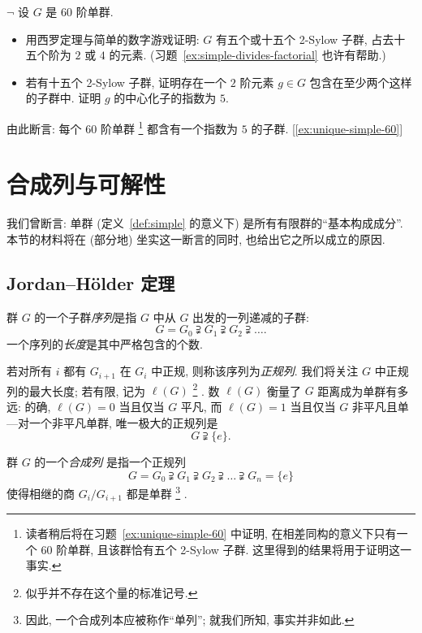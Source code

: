 \begin{prob}
\label{ex:simple-60}
$\neg$ 设 $G$ 是 $60$ 阶单群.
\begin{itemize}
	\item 用西罗定理与简单的数字游戏证明: $G$ 有五个或十五个 2-Sylow 子群, 占去十五个阶为 $2$ 或 $4$ 的元素. (习题~\ref{ex:simple-divides-factorial} 也许有帮助.)
	\item 若有十五个 2-Sylow 子群, 证明存在一个 $2$ 阶元素 $g\in G$ 包含在至少两个这样的子群中. 证明 $g$ 的中心化子的指数为 $5$.
\end{itemize}
由此断言: 每个 $60$ 阶单群%
\footnote{读者稍后将在习题~\ref{ex:unique-simple-60} 中证明, 在相差同构的意义下只有一个 $60$ 阶单群, 且该群恰有五个 2-Sylow 子群. 这里得到的结果将用于证明这一事实.}%
都含有一个指数为 $5$ 的子群. [\ref{ex:unique-simple-60}]
\end{prob}


\section{合成列与可解性}
\label{sec:composition-solvability}

我们曾断言: 单群 (定义~\ref{def:simple} 的意义下) 是所有有限群的``基本构成成分''. 本节的材料将在 (部分地) 坐实这一断言的同时, 也给出它之所以成立的原因.

\subsection{Jordan--H\"older 定理}
\label{subsec:composition-series}

群 $G$ 的一个子群\emph{序列}是指 $G$ 中从 $G$ 出发的一列递减的子群:
\[
G = G_0 \supsetneqq G_1 \supsetneqq G_2 \supsetneqq \dots .
\]
一个序列的\emph{长度}是其中严格包含的个数.

若对所有 $i$ 都有 $G_{i+1}$ 在 $G_i$ 中正规, 则称该序列为\emph{正规列}. 我们将关注 $G$ 中正规列的最大长度; 若有限, 记为 $\ell(G)$%
\footnote{似乎并不存在这个量的标准记号.}%
. 数 $\ell(G)$ 衡量了 $G$ 距离成为单群有多远: 的确, $\ell(G) = 0$ 当且仅当 $G$ 平凡, 而 $\ell(G) = 1$ 当且仅当 $G$ 非平凡且单---对一个非平凡单群, 唯一极大的正规列是
\[
G \supsetneqq \{e\}.
\]

\begin{definition}
\label{def:composition-series}
群 $G$ 的一个\emph{合成列}%
是指一个正规列
\[
G = G_0 \supsetneqq G_1 \supsetneqq G_2 \supsetneqq \dots \supsetneqq G_n = \{e\}
\]
使得相继的商 $G_i/G_{i+1}$ 都是单群%
\footnote{因此, 一个合成列本应被称作``单列''; 就我们所知, 事实并非如此.}%
.
\end{definition}

